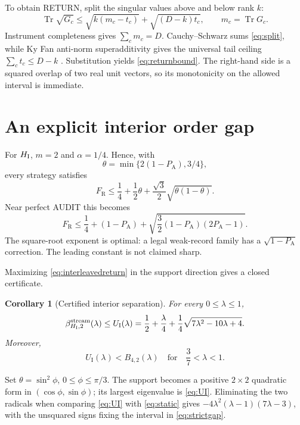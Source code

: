 \documentclass[10pt,twocolumn]{article}
\newtheorem{corollary}[theorem]{Corollary}
\theoremstyle{remark}
\newcommand{\Tr}{\operatorname{Tr}}
\newcommand{\PA}{P_{\mathrm A}}
\newcommand{\FR}{F_{\mathrm R}}
\newcommand{\BG}{B_{4,2}}
\newcommand{\UI}{U_{\mathrm I}}
\begin{document}
To obtain RETURN, split the singular values above and below rank $k$:
\begin{equation}
\Tr\sqrt{G_c}\leq
\sqrt{k(m_c-t_c)}+\sqrt{(D-k)t_c},
\qquad m_c=\Tr G_c.
\label{eq:split}
\end{equation}
Instrument completeness gives $\sum_cm_c=D$. Cauchy--Schwarz sums
\eqref{eq:split}, while Ky Fan anti-norm superadditivity gives the universal
tail ceiling $\sum_ct_c\leq D-k$ \cite{bhatia1997matrix}. Substitution yields
\eqref{eq:returnbound}. The right-hand side is a squared overlap of two real
unit vectors, so its monotonicity on the allowed interval is immediate.

\section{An explicit interior order gap}
\label{sec:gap}

For $H_{\rm I}$, $m=2$ and $\alpha=1/4$. Hence, with
\begin{equation}
\theta=\min\{2(1-\PA),3/4\},
\end{equation}
every strategy satisfies
\begin{equation}
\FR\leq\frac14+\frac12\theta
+\frac{\sqrt3}{2}\sqrt{\theta(1-\theta)}.
\label{eq:interleavedreturn}
\end{equation}
Near perfect AUDIT this becomes
\begin{equation}
\FR\leq\frac14+(1-\PA)
+\sqrt{\frac32(1-\PA)(2\PA-1)}.
\end{equation}
The square-root exponent is optimal: a legal weak-record family has a
$\sqrt{1-\PA}$ correction. The leading constant is not claimed sharp.

Maximizing \eqref{eq:interleavedreturn} in the support direction gives a
closed certificate.

\begin{corollary}[Certified interior separation]
For every $0\leq\lambda\leq1$,
\begin{equation}
\beta^{\rm stream}_{H_{\rm I},2}(\lambda)
\leq\UI(\lambda)
=\frac12+\frac\lambda4
+\frac14\sqrt{7\lambda^2-10\lambda+4}.
\label{eq:UI}
\end{equation}
Moreover,
\begin{equation}
\UI(\lambda)<\BG(\lambda)
\quad\text{for}\quad \frac37<\lambda<1.
\label{eq:strictgap}
\end{equation}
\end{corollary}

Set $\theta=\sin^2\phi$, $0\leq\phi\leq\pi/3$. The support becomes a positive
$2\times2$ quadratic form in $(\cos\phi,\sin\phi)$; its largest eigenvalue is
\eqref{eq:UI}. Eliminating the two radicals when comparing \eqref{eq:UI} with
\eqref{eq:static} gives
$-4\lambda^2(\lambda-1)(7\lambda-3)$, with the unsquared signs fixing the
interval in \eqref{eq:strictgap}.
\end{document}
